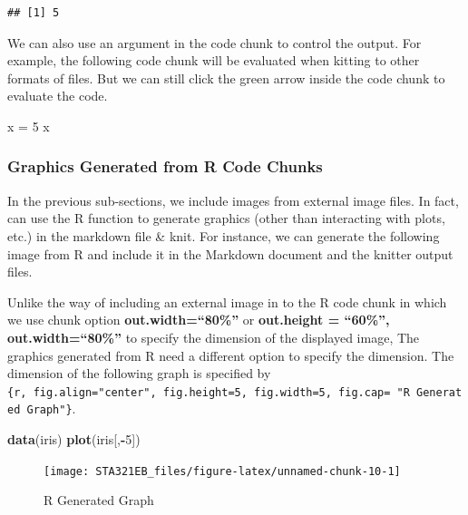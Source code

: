 \documentclass[
]{book}
\newenvironment{Shaded}{\begin{snugshade}}{\end{snugshade}}
\newcommand{\DecValTok}[1]{\textcolor[rgb]{0.00,0.00,0.81}{#1}}
\newcommand{\FunctionTok}[1]{\textcolor[rgb]{0.13,0.29,0.53}{\textbf{#1}}}
\newcommand{\NormalTok}[1]{#1}
\newcommand{\OtherTok}[1]{\textcolor[rgb]{0.56,0.35,0.01}{#1}}
\newcommand{\SpecialCharTok}[1]{\textcolor[rgb]{0.81,0.36,0.00}{\textbf{#1}}}
\begin{document}
\begin{verbatim}
## [1] 5
\end{verbatim}

We can also use an argument in the code chunk to control the output. For example, the following code chunk will be evaluated when kitting to other formats of files. But we can still click the green arrow inside the code chunk to evaluate the code.

\begin{Shaded}
\begin{Highlighting}[]
\NormalTok{x }\OtherTok{=} \DecValTok{5}
\NormalTok{x}
\end{Highlighting}
\end{Shaded}

\hypertarget{graphics-generated-from-r-code-chunks}{%
\subsubsection{Graphics Generated from R Code Chunks}\label{graphics-generated-from-r-code-chunks}}

In the previous sub-sections, we include images from external image files. In fact, can use the R function to generate graphics (other than interacting with plots, etc.) in the markdown file \& knit. For instance, we can generate the following image from R and include it in the Markdown document and the knitter output files.

Unlike the way of including an external image in to the R code chunk in which we use chunk option \textbf{out.width=``80\%''} or \textbf{out.height = ``60\%'', out.width=``80\%''} to specify the dimension of the displayed image, The graphics generated from R need a different option to specify the dimension. The dimension of the following graph is specified by \texttt{\{r,\ fig.align="center",\ fig.height=5,\ fig.width=5,\ fig.cap=\ "R\ Generated\ Graph"\}}.

\begin{Shaded}
\begin{Highlighting}[]
\FunctionTok{data}\NormalTok{(iris)}
\FunctionTok{plot}\NormalTok{(iris[,}\SpecialCharTok{{-}}\DecValTok{5}\NormalTok{])}
\end{Highlighting}
\end{Shaded}

\begin{figure}

{\centering \texttt{[image: STA321EB\_files/figure-latex/unnamed-chunk-10-1]} 

}

\caption{R Generated Graph}\label{fig:unnamed-chunk-10}
\end{figure}
\end{document}
